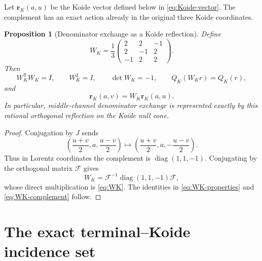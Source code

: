 \documentclass[11pt]{article}
\newtheorem{proposition}[theorem]{Proposition}
\theoremstyle{definition}
\theoremstyle{remark}
\begin{document}
Let \(\mathbf r_K(a,u)\) be the Koide vector defined below in
\eqref{eq:Koide-vector}.  The complement has an exact action already in the
original three Koide coordinates.

\begin{proposition}[Denominator exchange as a Koide reflection]
\label{prop:Koide-reflection}
Define
\begin{equation}\label{eq:WK}
 W_K=\frac13
 \begin{pmatrix}
  2&2&-1\\
  2&-1&2\\
  -1&2&2
 \end{pmatrix}.
\end{equation}
Then
\begin{equation}\label{eq:WK-properties}
 W_K^{\mathsf T}W_K=I,
 \qquad W_K^2=I,
 \qquad\det W_K=-1,
 \qquad Q_K(W_Kr)=Q_K(r),
\end{equation}
and
\begin{equation}\label{eq:WK-complement}
 \mathbf r_K(a,v)=W_K\mathbf r_K(a,u).
\end{equation}
In particular, middle-channel denominator exchange is represented exactly by
this rational orthogonal reflection on the Koide null cone.
\end{proposition}

\begin{proof}
Conjugation by \(J\) sends
\[
 \left(\frac{u+v}{2},a,\frac{u-v}{2}\right)
 \longmapsto
 \left(\frac{u+v}{2},a,-\frac{u-v}{2}\right).
\]
Thus in Lorentz coordinates the complement is
\(\operatorname{diag}(1,1,-1)\).  Conjugating by the orthogonal matrix
\(\mathcal F\) gives
\[
 W_K=\mathcal F^{-1}\operatorname{diag}(1,1,-1)\mathcal F,
\]
whose direct multiplication is \eqref{eq:WK}.  The identities in
\eqref{eq:WK-properties} and \eqref{eq:WK-complement} follow.
\end{proof}

\section{The exact terminal--Koide incidence set}
\end{document}
